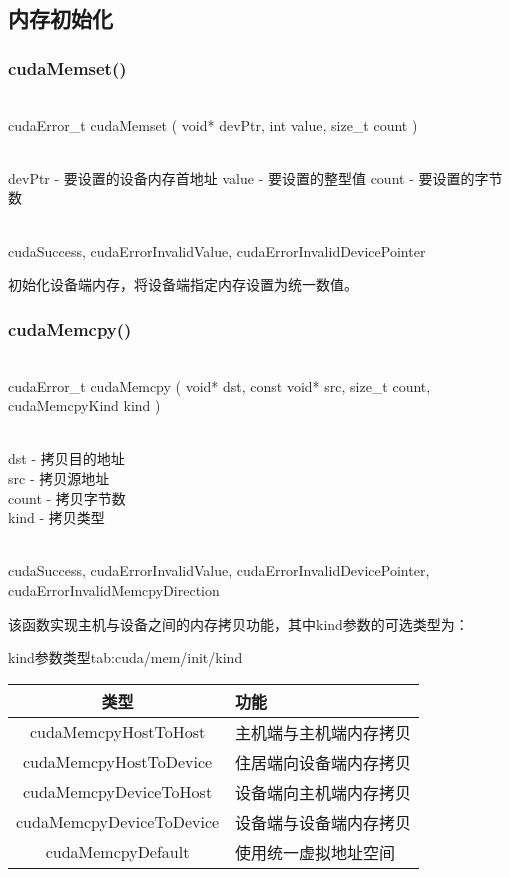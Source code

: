 \subsection{内存初始化}\label{cuda/mem/init}
\subsubsection{cudaMemset()}
\begin{cnfrmfunc}
   \item{}\\
     cudaError\_t cudaMemset ( void* devPtr, int  value, size\_t count )
   \item{}\\
     devPtr - 要设置的设备内存首地址
     value - 要设置的整型值
     count - 要设置的字节数
   \item{}\\
     cudaSuccess, cudaErrorInvalidValue, cudaErrorInvalidDevicePointer
\end{cnfrmfunc}
初始化设备端内存，将设备端指定内存设置为统一数值。
\subsubsection{cudaMemcpy()}
\begin{cnfrmfunc}
   \item{}\\
      ​cudaError\_t cudaMemcpy ( void* dst, const void* src, size\_t count, cudaMemcpyKind kind )
   \item{}\\
     dst - 拷贝目的地址\\
     src - 拷贝源地址\\
     count - 拷贝字节数\\
     kind - 拷贝类型
   \item{}\\
     cudaSuccess, cudaErrorInvalidValue, cudaErrorInvalidDevicePointer, cudaErrorInvalidMemcpyDirection
\end{cnfrmfunc}
该函数实现主机与设备之间的内存拷贝功能，其中kind参数的可选类型为：
\begin{cntable}{kind参数类型}{tab:cuda/mem/init/kind}
  \begin{tabular}{|c|l|}
    \hline
    类型 & 功能 \\ \hline
    cudaMemcpyHostToHost & 主机端与主机端内存拷贝 \\ \hline
    cudaMemcpyHostToDevice & 住居端向设备端内存拷贝 \\ \hline
    cudaMemcpyDeviceToHost & 设备端向主机端内存拷贝 \\ \hline
    cudaMemcpyDeviceToDevice & 设备端与设备端内存拷贝 \\ \hline
    cudaMemcpyDefault & 使用统一虚拟地址空间 \\ \hline
  \end{tabular}
\end{cntable}

